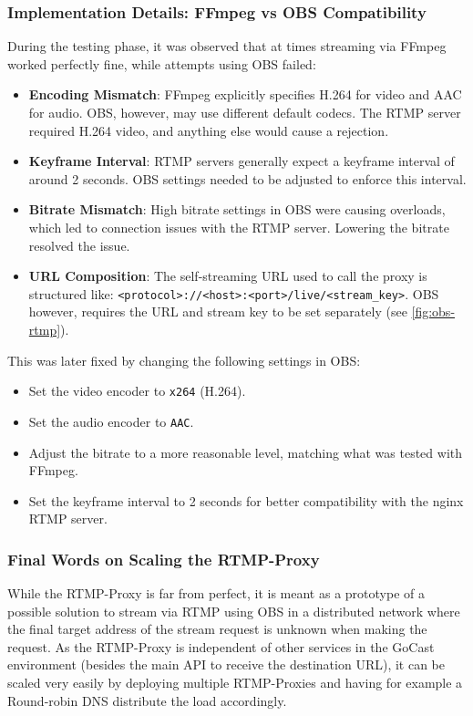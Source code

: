 \subsubsection{Implementation Details: FFmpeg vs OBS Compatibility}

During the testing phase, it was observed that at times streaming via FFmpeg worked perfectly fine, while attempts using OBS failed:
\begin{itemize}
    \item \textbf{Encoding Mismatch}: FFmpeg explicitly specifies H.264 for video and AAC for audio. OBS, however, may use different default codecs. The RTMP server required H.264 video, and anything else would cause a rejection.
    \item \textbf{Keyframe Interval}: RTMP servers generally expect a keyframe interval of around 2 seconds. OBS settings needed to be adjusted to enforce this interval.
    \item \textbf{Bitrate Mismatch}: High bitrate settings in OBS were causing overloads, which led to connection issues with the RTMP server. Lowering the bitrate resolved the issue.
    \item \textbf{URL Composition}: The self-streaming URL used to call the proxy is structured like: \texttt{<protocol>://<host>:<port>/live/<stream\_key>}. OBS however, requires the URL and stream key to be set separately (see \autoref{fig:obs-rtmp}).
\end{itemize}

This was later fixed by changing the following settings in OBS:
\begin{itemize}
    \item Set the video encoder to \texttt{x264} (H.264).
    \item Set the audio encoder to \texttt{AAC}.
    \item Adjust the bitrate to a more reasonable level, matching what was tested with FFmpeg.
    \item Set the keyframe interval to 2 seconds for better compatibility with the nginx \ac{RTMP} server.
\end{itemize}

\subsubsection{Final Words on Scaling the RTMP-Proxy}

While the RTMP-Proxy is far from perfect, it is meant as a prototype of a possible solution to stream via \ac{RTMP} using OBS in a distributed network where the final target address of the stream request is unknown when making the request. As the RTMP-Proxy is independent of other services in the GoCast environment (besides the main \ac{API} to receive the destination URL), it can be scaled very easily by deploying multiple RTMP-Proxies and having for example a Round-robin DNS distribute the load accordingly.

